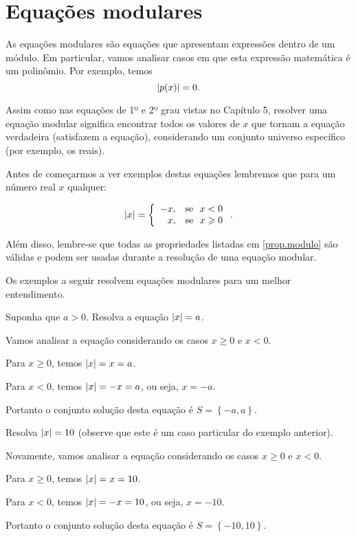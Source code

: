  \section{Equações modulares}

\begin{obs}
  As equações modulares são equações que apresentam expressões dentro de um módulo. Em particular, vamos analisar casos em que esta expressão matemática é um polinômio. Por exemplo, temos
  \[\left|p(x)\right|= 0.\]

  Assim como nas equações de 1º e 2º grau vistas no Capítulo 5, resolver uma equação modular significa encontrar todos os valores de $x$ que tornam a equação verdadeira (satisfazem a equação), considerando um conjunto universo específico (por exemplo, os reais).
 \end{obs}

 Antes de começarmos a ver exemplos destas equações lembremos que para um número real $x$ qualquer:

 \[
\left|x\right|= \left\{\begin{array}{rl}
      -x , & \text{se} \ \ x<0 \\
      x , & \text{se} \ \ x \geqslant 0
     \end{array}\right. .
\]

Além disso, lembre-se que todas as propriedades listadas em \ref{prop.modulo} são válidas e podem ser usadas durante a resolução de uma equação modular.

Os exemplos a seguir resolvem equações modulares para um melhor entendimento.

\begin{exem} 
  Suponha que $a> 0$. Resolva a equação $\left|x\right|= a$.

Vamos analisar a equação considerando os casos $x\geq 0$ e $x < 0$.

Para $x\geq 0$, temos $\left|x\right| = x = a$.

Para $x<0$, temos $\left|x\right| = -x = a$, ou seja, $x = -a$.

Portanto o conjunto solução desta equação é $S= \left\{-a, a \right\}$.
\end{exem}

\begin{exem}
  Resolva $\left|x\right|= 10$ (observe que este é um caso particular do exemplo anterior).

 Novamente, vamos analisar a equação considerando os casos $x\geq 0$ e $x < 0$.

Para $x\geq 0$, temos $\left|x\right| = x = 10$.

Para $x<0$, temos $\left|x\right| = -x = 10$, ou seja, $x = -10$.

Portanto o conjunto solução desta equação é $S= \left\{-10, 10 \right\}$.
\end{exem}


